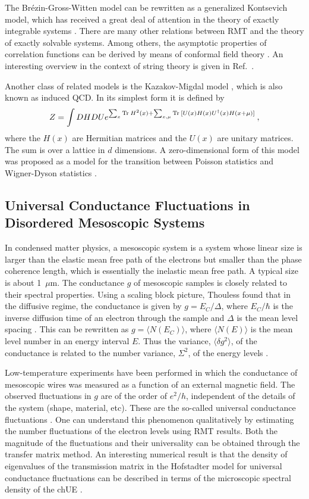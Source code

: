 The Br\'ezin-Gross-Witten model \cite{GW} can be rewritten as a
generalized Kontsevich model, which has received a great deal of
attention in the theory of exactly integrable systems
\cite{dijkgraaf,mironov}.  There are many other relations between RMT
and the theory of exactly solvable systems. Among others, the
asymptotic properties of correlation functions can be derived by means
of conformal field theory \cite{Kostov}.  An interesting overview in
the context of string theory is given in Ref.~\cite{dijkgraaf}.
 
Another class of related models is the Kazakov-Migdal model
\cite{Kazakov}, which is also known as induced QCD.  In its simplest
form it is defined by
\begin{equation}
  Z = \int DH DU e^{ \sum_x  {\rm Tr\:} H^2(x)+ \sum_{x,\mu}
    {\rm Tr\:}[U(x) H(x) U^\dagger(x) H(x+\mu)]} \:,
\end{equation}
where the $H(x)$ are Hermitian matrices and the $U(x)$ are unitary
matrices.  The sum is over a lattice in $d$ dimensions.  A
zero-dimensional form of this model was proposed as a model for the
transition between Poisson statistics and Wigner-Dyson statistics
\cite{Moshe,Garc00}.

\subsection{Universal Conductance Fluctuations in Disordered
  Mesoscopic Systems} 
\label{sec:ucf}

In condensed matter physics, a mesoscopic system is a system whose
linear size is larger than the elastic mean free path of the electrons
but smaller than the phase coherence length, which is essentially the
inelastic mean free path.  A typical size is about 1~$\mu$m.  The
conductance $g$ of mesoscopic samples is closely related to their
spectral properties.  Using a scaling block picture, Thouless found
that in the diffusive regime, the conductance is given by
$g=E_C/\Delta$, where $E_C/\hbar$ is the inverse diffusion time of an
electron through the sample and $\Delta$ is the mean level spacing
\cite{Thou74}.  This can be rewritten as $g=\langle N(E_C)\rangle$,
where $\langle N(E)\rangle$ is the mean level number in an energy
interval $E$.  Thus the variance, $\langle\delta g^2\rangle$, of the
conductance is related to the number variance, $\Sigma^2$, of the
energy levels \cite{altshuler}.

Low-temperature experiments have been performed in which the
conductance of mesoscopic wires was measured as a function of an
external magnetic field.  The observed fluctuations in $g$ are of the
order of $e^2/h$, independent of the details of the system (shape,
material, etc).  These are the so-called universal conductance
fluctuations \cite{Wash86}.  One can understand this phenomenon
qualitatively by estimating the number fluctuations of the electron
levels using RMT results.  Both the magnitude of the fluctuations and
their universality can be obtained through the transfer matrix
method.  An interesting numerical result is that the density of
eigenvalues of the transmission matrix in the Hofstadter model for
universal conductance fluctuations can be described in terms of the
microscopic spectral density of the chUE \cite{Hofstad,Slevin}.


